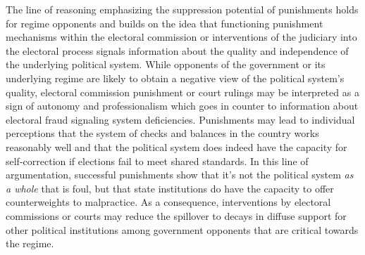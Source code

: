 \documentclass[11pt, ngerman,english,a4]{article}
\begin{document}
The line of reasoning emphasizing the suppression potential of punishments holds for regime opponents and builds on the idea that functioning punishment mechanisms within the electoral commission or interventions of the judiciary into the electoral process signals information about the quality and independence of the underlying political system. While opponents of the government or its underlying regime are likely to obtain a negative view of the political system's quality, electoral commission punishment or court rulings may be interpreted as a sign of autonomy and professionalism which goes in counter to information about electoral fraud signaling system deficiencies. Punishments may lead to individual perceptions that the system of checks and balances in the country works reasonably well and that the political system does indeed have the capacity for self-correction if elections fail to meet shared standards.  In this line of argumentation, successful punishments show that it's not the political system \textit{as a whole} that is foul, but that state institutions do have the capacity to offer counterweights to malpractice. As a consequence, interventions by electoral commissions or courts may reduce the spillover to decays in diffuse support for other political institutions among government opponents that are critical towards the regime. %
\end{document}
